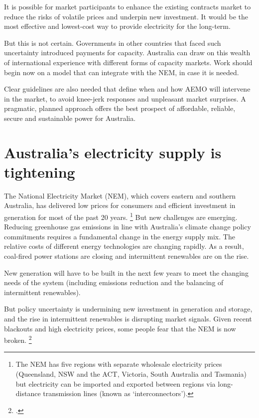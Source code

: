 \documentclass[FrontPage]{grattan}
\begin{document}
\begin{overview}
It is possible for market participants to enhance the existing contracts market to reduce the risks of volatile prices and underpin new investment. It would be the most effective and lowest-cost way to provide electricity for the long-term.

But this is not certain. Governments in other countries that faced such uncertainty introduced payments for capacity. Australia can draw on this wealth of international experience with different forms of capacity markets. Work should begin now on a model that can integrate with the NEM, in case it is needed.

Clear guidelines are also needed that define when and how AEMO will intervene in the market, to avoid knee-jerk responses and unpleasant market surprises. A pragmatic, planned approach offers the best prospect of affordable, reliable, secure and sustainable power for Australia.
\end{overview}


\contentspage

\chapter{Australia's electricity supply is tightening}\label{chap:australias-electricity-supply-is-tightening}

The National Electricity Market (NEM), which covers eastern and southern Australia, has delivered low prices for consumers and efficient investment in generation for most of the past 20 years.%
\footnote{The NEM has five regions with separate wholesale electricity prices (Queensland, NSW and the ACT, Victoria, South Australia and Tasmania) but electricity can be imported and exported between regions via long-distance transmission lines (known as `interconnectors').}
But new challenges are emerging. Reducing greenhouse gas emissions in line with Australia's climate change policy commitments requires a fundamental change in the energy supply mix. The relative costs of different energy technologies are changing rapidly. As a result, coal-fired power stations are closing and intermittent renewables are on the rise.

New generation will have to be built in the next few years to meet the changing needs of the system (including emissions reduction and the balancing of intermittent renewables).

But policy uncertainty is undermining new investment in generation and storage, and the rise in intermittent renewables is disrupting market signals. Given recent blackouts and high electricity prices, some people fear that the NEM is now broken.%
\footcites{Bailey2017NEMbroken}{ABC2017WeatherillNEMbroken}{AFR2017BHPNEMbroken}{AFR2017TingleNEMbroken}{Nelson2016NewNEM}
\end{document}
